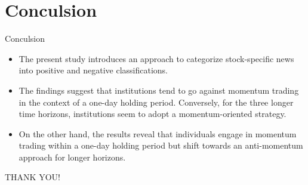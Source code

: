 \documentclass{beamer}
\begin{document}
\section{Conculsion}


\begin{frame}{Conculsion}
    \begin{itemize}
        \item The present study introduces an approach to categorize stock-specific news into positive and negative classifications.
        \item The findings suggest that institutions tend to go against momentum trading in the context of a one-day holding period. Conversely, for the three longer time horizons, institutions seem to adopt a momentum-oriented strategy.
        \item On the other hand, the results reveal that individuals engage in momentum trading within a one-day holding period but shift towards an anti-momentum approach for longer horizons.
    \end{itemize}
\end{frame}


\begin{frame}
    \Huge
    \center
    THANK YOU!
\end{frame}
\end{document}
